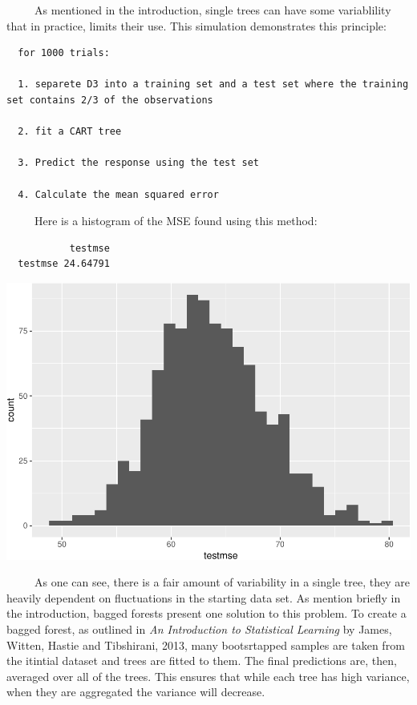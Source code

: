 \documentclass[12pt,twoside]{reedthesis}
\begin{document}
  ~~~~~As mentioned in the introduction, single trees can have some
  variablility that in practice, limits their use. This simulation
  demonstrates this principle:
  
  \begin{verbatim}
  for 1000 trials:
  
  1. separete D3 into a training set and a test set where the training set contains 2/3 of the observations
  
  2. fit a CART tree
  
  3. Predict the response using the test set 
  
  4. Calculate the mean squared error 
  \end{verbatim}
  
  ~~~~~Here is a histogram of the MSE found using this method:
  
  \begin{verbatim}
           testmse
  testmse 24.64791
  \end{verbatim}
  
  \begin{center}\includegraphics{Thesis_files/figure-latex/unnamed-chunk-11-1} \end{center}
  
  ~~~~~As one can see, there is a fair amount of variability in a single
  tree, they are heavily dependent on fluctuations in the starting data
  set. As mention briefly in the introduction, bagged forests present one
  solution to this problem. To create a bagged forest, as outlined in
  \emph{An Introduction to Statistical Learning} by James, Witten, Hastie
  and Tibshirani, 2013, many bootsrtapped samples are taken from the
  itintial dataset and trees are fitted to them. The final predictions
  are, then, averaged over all of the trees. This ensures that while each
  tree has high variance, when they are aggregated the variance will
  decrease.
  
\end{document}
